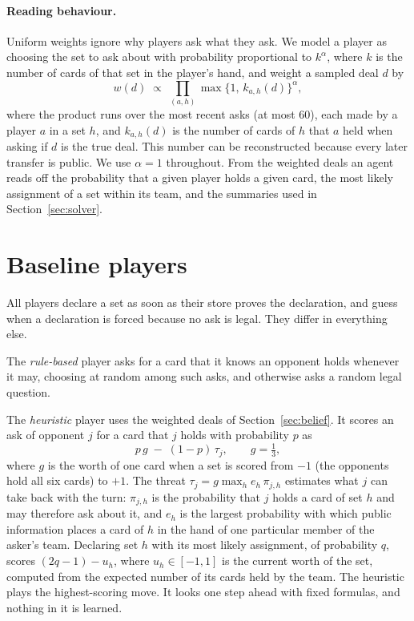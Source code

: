 \documentclass{article}
\begin{document}
\paragraph{Reading behaviour.}
Uniform weights ignore why players ask what they ask.  We model a player as
choosing the set to ask about with probability proportional to $k^{\alpha}$,
where $k$ is the number of cards of that set in the player's hand, and weight a
sampled deal $d$ by
\begin{equation}
  w(d) \;\propto\; \prod_{(a,h)} \max\{1,\, k_{a,h}(d)\}^{\alpha} ,
\end{equation}
where the product runs over the most recent asks (at most 60), each made by a
player $a$ in a set $h$, and $k_{a,h}(d)$ is the number of cards of $h$ that
$a$ held when asking if $d$ is the true deal.  This number can be reconstructed
because every later transfer is public.  We use $\alpha = 1$ throughout.  From
the weighted deals an agent reads off the probability that a given player holds
a given card, the most likely assignment of a set within its team, and the
summaries used in Section~\ref{sec:solver}.

\section{Baseline players}
\label{sec:baselines}

All players declare a set as soon as their store proves the declaration, and
guess when a declaration is forced because no ask is legal.  They differ in
everything else.

The \emph{rule-based} player asks for a card that it knows an opponent holds
whenever it may, choosing at random among such asks, and otherwise asks a
random legal question.

The \emph{heuristic} player uses the weighted deals of
Section~\ref{sec:belief}.  It scores an ask of opponent $j$ for a card that $j$
holds with probability $p$ as
\begin{equation}
  p\,g \;-\; (1-p)\,\tau_j , \qquad g = \tfrac{1}{3} ,
\end{equation}
where $g$ is the worth of one card when a set is scored from $-1$ (the
opponents hold all six cards) to $+1$.  The threat
$\tau_j = g \max_h e_h\,\pi_{j,h}$ estimates what $j$ can take back with the
turn: $\pi_{j,h}$ is the probability that $j$ holds a card of set $h$ and may
therefore ask about it, and $e_h$ is the largest probability with which public
information places a card of $h$ in the hand of one particular member of the
asker's team.  Declaring set $h$ with its most likely assignment, of
probability $q$, scores $(2q-1) - u_h$, where $u_h \in [-1,1]$ is the current
worth of the set, computed from the expected number of its cards held by the
team.  The heuristic plays the highest-scoring move.  It looks one step ahead
with fixed formulas, and nothing in it is learned.
\end{document}
